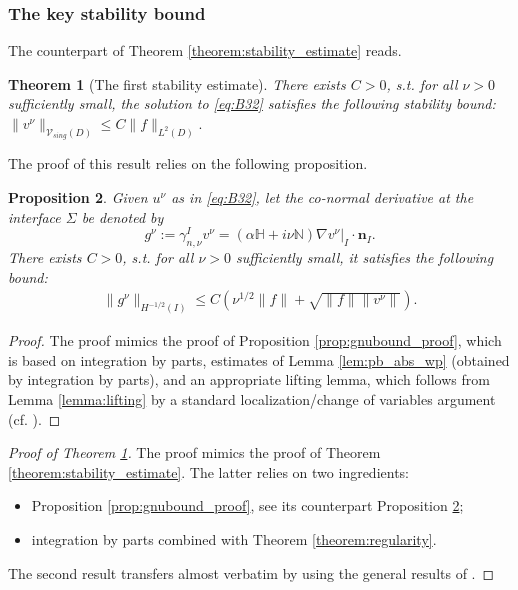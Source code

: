 \documentclass[report]{elsarticle}
\newtheorem{theorem}{Theorem}[section]
\newtheorem{proposition}[theorem]{Proposition}
\numberwithin{theorem}{section}
\renewcommand{\vec}[1]{\mathbf{#1}}
\begin{document}
\subsubsection{The key stability bound}
The counterpart of Theorem \ref{theorem:stability_estimate} reads. 
\begin{theorem}[The first stability estimate]
	\label{theorem:stability_estimate_general}
	There exists $C>0$, s.t. for all $\nu>0$ sufficiently small, the solution to \eqref{eq:B32} satisfies the following stability bound: $
		\|v^{\nu}\|_{\mathcal{V}_{sing}(D)}\leq C\|f\|_{L^2(D)}.$
\end{theorem}
The proof of this result relies on the following proposition. 
\begin{proposition}
	\label{prop:gnubound_proof_general}
	Given $u^{\nu}$ as in \eqref{eq:B32}, let the co-normal derivative at the interface $\Sigma$ be denoted by 
	$$g^{\nu}:=\gamma_{n, \nu}^{I}v^{\nu}=\left.( \alpha \mathbb{H}+i\nu\mathbb{N})\nabla v^{\nu}\right|_{I}\cdot \vec{n}_I.%
	$$
	There exists $C>0$, s.t. for all $\nu>0$ sufficiently small, it satisfies the following bound:
	\begin{align}
		\label{eq:gnubound_general}
		\|g^{\nu}\|_{{H}^{-1/2}(I)}\leq C\left(  \nu^{1/2}\|f\|+\sqrt{\|f\|\|v^{\nu}\|}\right).
	\end{align}
\end{proposition}
\begin{proof}
	The proof mimics the proof of Proposition \ref{prop:gnubound_proof}, which is based on integration by parts, estimates of Lemma \ref{lem:pb_abs_wp}  (obtained by integration by parts), and an appropriate lifting lemma, which follows from Lemma \ref{lemma:lifting} by a standard localization/change of variables argument (cf. \cite[proof of Lemma 2.7.3]{sayas_tdbie}).
\end{proof}
\begin{proof}[Proof of Theorem \ref{theorem:stability_estimate_general}]
The proof mimics the proof of Theorem \ref{theorem:stability_estimate}. The latter relies on two ingredients: 
\begin{itemize}
	\item Proposition \ref{prop:gnubound_proof}, see its counterpart Proposition \ref{prop:gnubound_proof_general}; 
	\item integration by parts combined with Theorem \ref{theorem:regularity}. 
\end{itemize}
The second result transfers almost verbatim by using the general results of \cite{baouendi_goulaouic}.
\end{proof}
\end{document}
